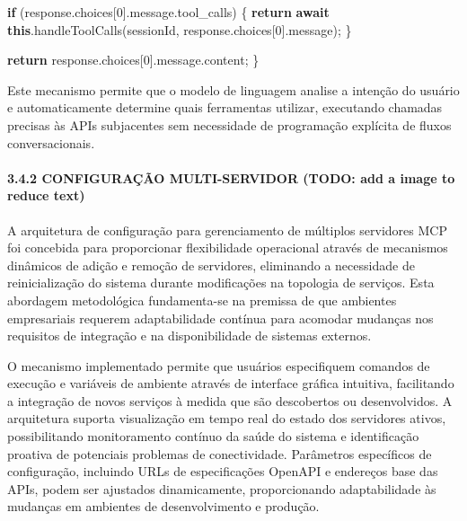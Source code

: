 \documentclass[
]{article}
\newenvironment{Shaded}{}{}
\newcommand{\AttributeTok}[1]{\textcolor[rgb]{0.49,0.56,0.16}{#1}}
\newcommand{\ControlFlowTok}[1]{\textcolor[rgb]{0.00,0.44,0.13}{\textbf{#1}}}
\newcommand{\DecValTok}[1]{\textcolor[rgb]{0.25,0.63,0.44}{#1}}
\newcommand{\FunctionTok}[1]{\textcolor[rgb]{0.02,0.16,0.49}{#1}}
\newcommand{\KeywordTok}[1]{\textcolor[rgb]{0.00,0.44,0.13}{\textbf{#1}}}
\newcommand{\NormalTok}[1]{#1}
\newcommand{\OperatorTok}[1]{\textcolor[rgb]{0.40,0.40,0.40}{#1}}
\begin{document}
\begin{Shaded}
\begin{Highlighting}[]
  \ControlFlowTok{if}\NormalTok{ (response}\OperatorTok{.}\AttributeTok{choices}\NormalTok{[}\DecValTok{0}\NormalTok{]}\OperatorTok{.}\AttributeTok{message}\OperatorTok{.}\AttributeTok{tool\_calls}\NormalTok{) \{}
    \ControlFlowTok{return} \ControlFlowTok{await} \KeywordTok{this}\OperatorTok{.}\FunctionTok{handleToolCalls}\NormalTok{(sessionId}\OperatorTok{,}\NormalTok{ response}\OperatorTok{.}\AttributeTok{choices}\NormalTok{[}\DecValTok{0}\NormalTok{]}\OperatorTok{.}\AttributeTok{message}\NormalTok{)}\OperatorTok{;}
\NormalTok{  \}}
  
  \ControlFlowTok{return}\NormalTok{ response}\OperatorTok{.}\AttributeTok{choices}\NormalTok{[}\DecValTok{0}\NormalTok{]}\OperatorTok{.}\AttributeTok{message}\OperatorTok{.}\AttributeTok{content}\OperatorTok{;}
\NormalTok{\}}
\end{Highlighting}
\end{Shaded}

Este mecanismo permite que o modelo de linguagem analise a intenção do
usuário e automaticamente determine quais ferramentas utilizar,
executando chamadas precisas às APIs subjacentes sem necessidade de
programação explícita de fluxos conversacionais.

\paragraph{3.4.2 CONFIGURAÇÃO MULTI-SERVIDOR (TODO: add a image to
reduce
text)}\label{configurauxe7uxe3o-multi-servidor-todo-add-a-image-to-reduce-text}

A arquitetura de configuração para gerenciamento de múltiplos servidores
MCP foi concebida para proporcionar flexibilidade operacional através de
mecanismos dinâmicos de adição e remoção de servidores, eliminando a
necessidade de reinicialização do sistema durante modificações na
topologia de serviços. Esta abordagem metodológica fundamenta-se na
premissa de que ambientes empresariais requerem adaptabilidade contínua
para acomodar mudanças nos requisitos de integração e na disponibilidade
de sistemas externos.

O mecanismo implementado permite que usuários especifiquem comandos de
execução e variáveis de ambiente através de interface gráfica intuitiva,
facilitando a integração de novos serviços à medida que são descobertos
ou desenvolvidos. A arquitetura suporta visualização em tempo real do
estado dos servidores ativos, possibilitando monitoramento contínuo da
saúde do sistema e identificação proativa de potenciais problemas de
conectividade. Parâmetros específicos de configuração, incluindo URLs de
especificações OpenAPI e endereços base das APIs, podem ser ajustados
dinamicamente, proporcionando adaptabilidade às mudanças em ambientes de
desenvolvimento e produção.
\end{document}

